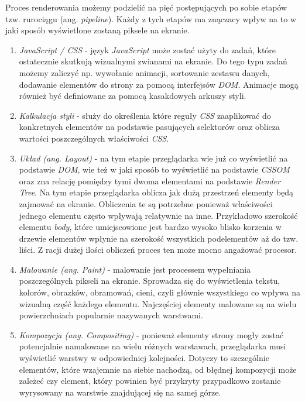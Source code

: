 \documentclass[polish, twoside, 12pt]{mwart}
\begin{document}
Proces renderowania możemy podzielić na pięć postępujących po sobie etapów tzw. rurociągu (ang. \emph{pipeline}). Każdy z tych etapów ma znączacy wpływ na to w jaki sposób wyświetlone zostaną piksele na ekranie.

\begin{enumerate}
  \item \emph{JavaScript / CSS} - język \emph{JavaScript} może zostać użyty do zadań, które ostatecznie skutkują wizualnymi zwianami na ekranie. Do tego typu zadań możemy zaliczyć np. wywołanie animacji, sortowanie zestawu danych, dodawanie elementów do strony za pomocą interfejsów \emph{DOM}. Animacje mogą również być definiowane za pomocą kasakdowych arkuszy styli.
  \item \emph{Kalkulacja styli} - służy do określenia które reguły \emph{CSS} zaaplikować do konkretnych elementów na podstawie pasujących selektorów oraz oblicza wartości poszczególnych właściwości \emph{CSS}.
  \item \emph{Układ (ang. Layout)} - na tym etapie przeglądarka wie już co wyświetlić na podstawie \emph{DOM}, wie też w jaki sposób to wyświetlić na podstawie \emph{CSSOM} oraz zna relację pomiędzy tymi dwoma elementami na podstawie \emph{Render Tree}. Na tym etapie przeglądarka oblicza jak dużą przestrzeń elementy będą zajmować na ekranie. Obliczenia te są potrzebne ponieważ właściwości jednego elementu często wpływają relatywnie na inne. Przykładowo szerokość elementu \emph{body}, które umiejscowione jest bardzo wysoko blisko korzenia w drzewie elementów wpłynie na szerokość wszystkich podelementów aż do tzw. liści. Z racji dużej ilości obliczeń proces ten może mocno angażować procesor.
  \item \emph{Malowanie (ang. Paint)} - malowanie jest processem wypełniania poszczególnych pikseli na ekranie. Sprowadza się do wyświetlenia tekstu, kolorów, obrazków, obramowań, cieni, czyli głównie wszystkiego co wpływa na wizualną część każdego elementu. Najczęściej elementy malowane są na wielu powierzchniach popularnie nazywanych warstwami.
  \item \emph{Kompozycja (ang. Compositing)} - ponieważ elementy strony mogły zostać potencjalnie namalowane na wielu różnych warstawach, przeglądarka musi wyświetlić warstwy w odpowiedniej kolejności. Dotyczy to szczególnie elementów, które wzajemnie na siebie nachodzą, od błędnej kompozycji może zależeć czy element, który powinien być przykryty przypadkowo zostanie wyrysowany na warstwie znajdującej się na samej górze.
\end{enumerate}
\end{document}
